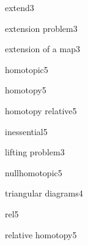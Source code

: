 
\begin{theindex}


\item{extend}\hfill{3}
\item{extension problem}\hfill{3}
\item{extension of a map}\hfill{3}

\item{homotopic}\hfill{5}
\item{homotopy}\hfill{5}
\item{homotopy relative}\hfill{5}

\item{inessential}\hfill{5}

\item{lifting problem}\hfill{3}

\item{nullhomotopic}\hfill{5}

\item{triangular diagrams}\hfill{4}

\item{rel}\hfill{5}
\item{relative homotopy}\hfill{5}


\end{theindex}
